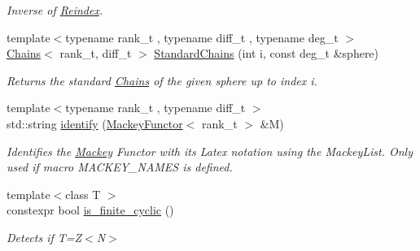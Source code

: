 \begin{DoxyCompactItemize}
\begin{DoxyCompactList}\small\item\em Inverse of \hyperlink{namespaceMackey_a7da73ade3ee83c4ffd614e79242d7c04}{Reindex}. \end{DoxyCompactList}\item 
{\footnotesize template$<$typename rank\+\_\+t , typename diff\+\_\+t , typename deg\+\_\+t $>$ }\\\hyperlink{classMackey_1_1Chains}{Chains}$<$ rank\+\_\+t, diff\+\_\+t $>$ \hyperlink{namespaceMackey_aac9deeccbe291d1dd17df46a3d7c1f2b}{Standard\+Chains} (int i, const deg\+\_\+t \&sphere)
\begin{DoxyCompactList}\small\item\em Returns the standard \hyperlink{classMackey_1_1Chains}{Chains} of the given sphere up to index i. \end{DoxyCompactList}\item 
{\footnotesize template$<$typename rank\+\_\+t , typename diff\+\_\+t $>$ }\\std\+::string \hyperlink{namespaceMackey_aef8ef1f2b3e72e33d5c028a76d1577db}{identify} (\hyperlink{classMackey_1_1MackeyFunctor}{Mackey\+Functor}$<$ rank\+\_\+t $>$ \&M)
\begin{DoxyCompactList}\small\item\em Identifies the \hyperlink{namespaceMackey}{Mackey} Functor with its Latex notation using the Mackey\+List. Only used if macro M\+A\+C\+K\+E\+Y\+\_\+\+N\+A\+M\+ES is defined. \end{DoxyCompactList}\item 
{\footnotesize template$<$class T $>$ }\\constexpr bool \hyperlink{namespaceMackey_afe8e1404c86fb9609734d3e0074ac7ed}{is\+\_\+finite\+\_\+cyclic} ()
\begin{DoxyCompactList}\small\item\em Detects if T=Z$<$\+N$>$ \end{DoxyCompactList}\end{DoxyCompactItemize}
